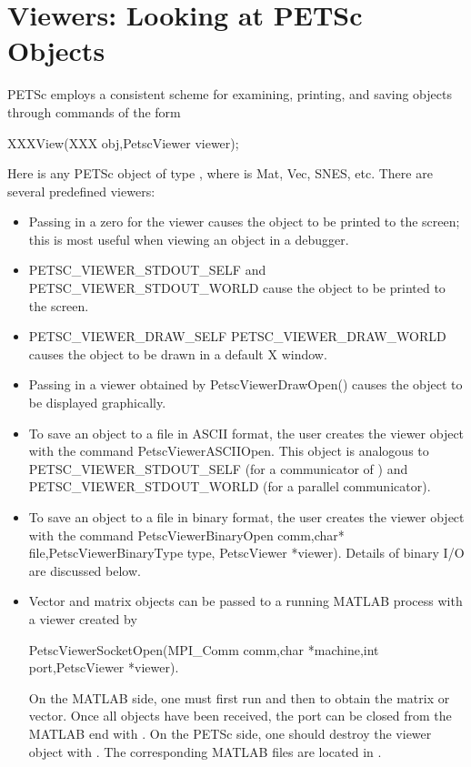 {{{\section{Viewers: Looking at PETSc Objects} \label{sec_viewers}

PETSc employs a consistent scheme for examining, printing, and
saving objects through commands of the form
\begin{tabbing}
  XXXView(XXX obj,PetscViewer viewer);
\end{tabbing}
Here  is any PETSc object of type
,  where 
is Mat, Vec, SNES, etc. There are several
predefined viewers:
\begin{itemize}
\item Passing in a zero for the viewer causes the object to be printed
      to the screen; this is most useful when viewing an object in
      a debugger.
\item PETSC\_VIEWER\_STDOUT\_SELF and
      PETSC\_VIEWER\_STDOUT\_WORLD
      cause the object to be printed to the screen.

\item PETSC\_VIEWER\_DRAW\_SELF
      PETSC\_VIEWER\_DRAW\_WORLD causes the
      object to be drawn in a default X window.
\item Passing in a viewer obtained by
      PetscViewerDrawOpen() causes the object to be displayed graphically.
\item To save an object to a file in ASCII format, the user creates
      the viewer object with the command
      PetscViewerASCIIOpen.
      This object is
      analogous to PETSC\_VIEWER\_STDOUT\_SELF (for a communicator of
      ) and
      PETSC\_VIEWER\_STDOUT\_WORLD (for a parallel communicator).
\item To save an object to a file in binary format, the user creates
      the viewer object with the command
      PetscViewerBinaryOpen comm,char* file,PetscViewerBinaryType type,
      PetscViewer *viewer). Details of binary
      I/O are discussed below.
\item Vector and matrix objects can be passed to a running MATLAB process
      with a viewer created by
\begin{tabbing}
     PetscViewerSocketOpen(MPI\_Comm comm,char *machine,int port,PetscViewer *viewer).
\end{tabbing}
      On the MATLAB side, one must first run 
      and then  to obtain the matrix or vector. Once all
      objects have been received, the port can be closed from the MATLAB end
      with . On the PETSc side, one should destroy
      the viewer object with  . The corresponding MATLAB 
      files are located in .
\end{itemize}

}}}
